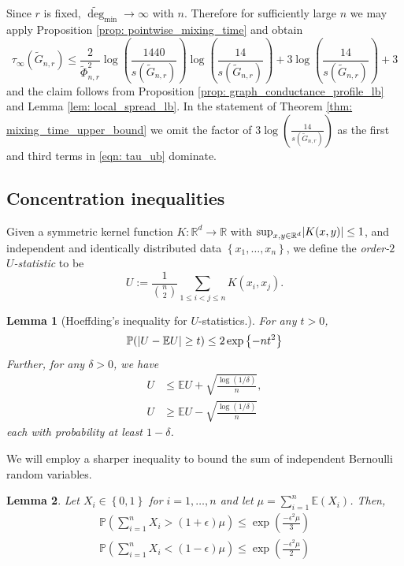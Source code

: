 \documentclass[11pt,twoside]{article}
\newtheorem{lemma}{Lemma}
\DeclarePairedDelimiter\abs{\lvert}{\rvert}
\newcommand{\set}[1]{\left\{#1\right\}}
\newcommand{\Reals}{\mathbb{R}}
\newcommand{\Rd}{\Reals^d}
\newcommand{\1}{\mathbf{1}}
\newcommand{\Pbb}{\mathbb{P}}
\newcommand{\Ebb}{\mathbb{E}}
\newcommand{\degminwt}{\widetilde{\deg}_{\min}}
\begin{document}
Since $r$ is fixed, $\degminwt \to \infty$ with $n$. Therefore for sufficiently large $n$ we may apply Proposition \ref{prop: pointwise_mixing_time} and obtain
\begin{equation}
\label{eqn: tau_ub}
\tau_{\infty}(\widetilde{G}_{n,r}) \leq \frac{2}{\widetilde{\Phi}_{n,r}^2} \log\left(\frac{1440}{s(\widetilde{G}_{n,r})}\right) \log \left(\frac{14}{s(\widetilde{G}_{n,r})}\right) + 3 \log\left(\frac{14}{s(\widetilde{G}_{n,r})}\right) + 3
\end{equation}
and the claim follows from Proposition \ref{prop: graph_conductance_profile_lb} and Lemma \ref{lem: local_spread_lb}. In the statement of Theorem \ref{thm: mixing_time_upper_bound} we omit the factor of $3 \log\left(\frac{14}{s(\widetilde{G}_{n,r})}\right)$ as the first and third terms in \eqref{eqn: tau_ub} dominate.

\subsection{Concentration inequalities}
\label{sec: concentration}

Given a symmetric kernel function $K: \Rd \to \Reals$ with $\sup_{x,y \in \Rd} \abs{K(x,y)} \leq 1$, and independent and identically distributed data $\set{x_1, \ldots, x_n}$, we define the \textit{order-$2$ $U$-statistic} to be 
\begin{equation*}
U := \frac{1}{ {n \choose 2} } \sum_{1 \leq i < j \leq n} K(x_i,x_j).
\end{equation*}

\begin{lemma}[Hoeffding's inequality for $U$-statistics.]
	\label{lem: bounded_difference}
	For any $t > 0$,
	\begin{equation*}
	\mathbb{P}(\abs{U - \mathbb{E}U} \geq t) \leq 2 \exp\left\{-nt^2\right\}
	\end{equation*}
	Further, for any $\delta > 0$, we have
	\begin{align*}
	U & \leq \mathbb{E}U + \sqrt{\frac{\log(1 / \delta)}{n} }, \\
	U & \geq \mathbb{E}U - \sqrt{\frac{\log(1 / \delta)}{n} }
	\end{align*}
	each with probability at least $1 - \delta$. 
\end{lemma}

We will employ a sharper inequality to bound the sum of independent Bernoulli random variables.
\begin{lemma}
	\label{lem: multiplicative_Hoeffding}
	Let $X_i \in \set{0,1}$ for $i = 1, \ldots, n$ and let $\mu = \sum_{i = 1}^n \Ebb(X_i)$. Then,
	\begin{align*}
	\Pbb\left(\sum_{i=1}^{n}X_i > (1 + \epsilon) \mu \right) \leq \exp \left(\frac{-\epsilon^2 \mu}{3}\right) \\
	\Pbb\left(\sum_{i=1}^{n}X_i < (1 - \epsilon) \mu \right) \leq \exp \left(\frac{-\epsilon^2 \mu}{2}\right)
	\end{align*}
\end{lemma}
\end{document}

